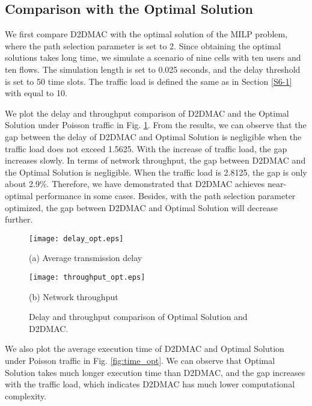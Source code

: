 \documentclass[journal]{IEEEtran}
\begin{document}
\subsection{Comparison with the Optimal Solution}

We first compare D2DMAC with the optimal solution of the MILP problem, where the path selection
parameter  is set to 2. Since obtaining the optimal solutions takes long time, we simulate a scenario of nine cells with ten users and ten flows.
The simulation length is set to 0.025 seconds, and the delay threshold is set to 50 time slots.
The traffic load is defined the same as in Section \ref{S6-1} with  equal to 10.






We plot the delay and throughput comparison of D2DMAC and the Optimal Solution under Poisson
traffic in Fig. \ref{fig:comparison_opt}. From the results, we can observe that the gap between the delay of D2DMAC and Optimal Solution is negligible when the traffic load does not exceed 1.5625. With the increase of traffic load, the gap increases slowly. In
terms of network throughput, the gap between D2DMAC and the Optimal Solution is negligible. When the traffic load is 2.8125, the gap is only about 2.9\%. Therefore, we have demonstrated that D2DMAC achieves near-optimal
performance in some cases. Besides, with the path selection parameter  optimized, the gap between D2DMAC
and Optimal Solution will decrease further.




\begin{figure}[htbp]
\begin{minipage}[t]{0.5\linewidth}
\centering
\texttt{[image: delay\_opt.eps]}
\centerline{\small (a) Average transmission delay}
\end{minipage}\begin{minipage}[t]{0.5\linewidth}
\centering
\texttt{[image: throughput\_opt.eps]}
\centerline{\small (b) Network throughput}
\end{minipage}\caption{Delay and throughput comparison of Optimal Solution and D2DMAC.}
\label{fig:comparison_opt} \vspace*{-3mm}
\end{figure}







We also plot the average execution time of D2DMAC and Optimal Solution under Poisson traffic in
Fig. \ref{fig:time_opt}. We can observe that
Optimal Solution takes much longer execution time than D2DMAC, and the gap increases with the
traffic load, which indicates D2DMAC has much lower computational complexity.
\end{document}
